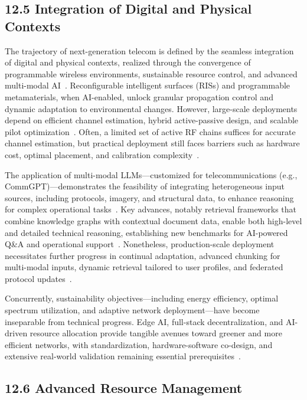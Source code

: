 \documentclass[11pt]{article}
\begin{document}
\subsection{12.5 Integration of Digital and Physical Contexts}

The trajectory of next-generation telecom is defined by the seamless integration of digital and physical contexts, realized through the convergence of programmable wireless environments, sustainable resource control, and advanced multi-modal AI~\cite{7,10,17,18,19,20,21,22,23,24,25,26,27,28,29,30,35,39,40}. Reconfigurable intelligent surfaces (RISs) and programmable metamaterials, when AI-enabled, unlock granular propagation control and dynamic adaptation to environmental changes. However, large-scale deployments depend on efficient channel estimation, hybrid active-passive design, and scalable pilot optimization~\cite{27,29,30,39,40}. Often, a limited set of active RF chains suffices for accurate channel estimation, but practical deployment still faces barriers such as hardware cost, optimal placement, and calibration complexity~\cite{27,29,30}.

The application of multi-modal LLMs—customized for telecommunications (e.g., CommGPT)—demonstrates the feasibility of integrating heterogeneous input sources, including protocols, imagery, and structural data, to enhance reasoning for complex operational tasks~\cite{26,35}. Key advances, notably retrieval frameworks that combine knowledge graphs with contextual document data, enable both high-level and detailed technical reasoning, establishing new benchmarks for AI-powered Q\&A and operational support~\cite{26,35}. Nonetheless, production-scale deployment necessitates further progress in continual adaptation, advanced chunking for multi-modal inputs, dynamic retrieval tailored to user profiles, and federated protocol updates~\cite{26,35}.

Concurrently, sustainability objectives—including energy efficiency, optimal spectrum utilization, and adaptive network deployment—have become inseparable from technical progress. Edge AI, full-stack decentralization, and AI-driven resource allocation provide tangible avenues toward greener and more efficient networks, with standardization, hardware-software co-design, and extensive real-world validation remaining essential prerequisites~\cite{17,18,26,28,29,30,35,39,40}.

\subsection{12.6 Advanced Resource Management}
\end{document}
